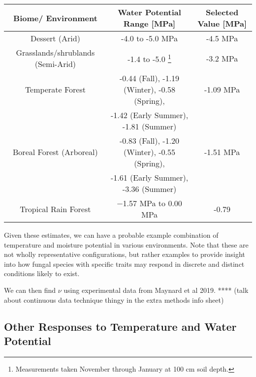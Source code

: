 \documentclass{article}
\begin{document}
\begin{savenotes}
\begin{table}[ht]
\begin{center}
 \begin{tabular}{|c c c|} 
 \hline
 Biome/ Environment & Water Potential Range [MPa] & Selected Value [MPa] \\ [0.5ex] 
 \hline\hline
 Dessert (Arid) & -4.0 to -5.0 MPa \cite{Nilsen1983} & -4.5 MPa \\ 
 \hline
 Grasslands/shrublands (Semi-Arid) & -1.4 to -5.0 \footnote{Measurements taken November through January at 100 cm soil depth.} \cite{Pelaez 1994} & -3.2 MPa\\
 \hline
 Temperate Forest & -0.44 (Fall), -1.19 (Winter), -0.58 (Spring), & -1.09 MPa\\
 &-1.42 (Early Summer), -1.81 (Summer) \cite{Zobel2001}&\\
 \hline
 Boreal Forest (Arboreal) & -0.83 (Fall), -1.20 (Winter), -0.55 (Spring),& -1.51 MPa\\
 &-1.61 (Early Summer), -3.36 (Summer) \cite{Zobel2001} &\\
 \hline
 Tropical Rain Forest & −1.57 MPa to 0.00 MPa  \cite{Kupers2018} & -0.79 \\ 
 \hline
\end{tabular}
\end{center}
\end{table}
\end{savenotes}

Given these estimates, we can have a probable example combination of temperature and moisture potential in various environments. Note that these are not wholly representative configurations, but rather examples to provide insight into how fungal species with specific traits may respond in discrete and distinct conditions likely to exist. 

We can then find $\nu$ using experimental data from Maynard et al 2019. **** (talk about continuous data technique thingy in the extra methods info sheet)


\subsection{Other Responses to Temperature and Water Potential}
\end{document}
